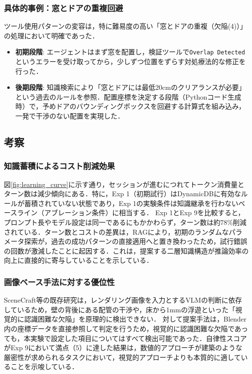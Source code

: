 \documentclass[dvipdfmx, a4paper, 9pt]{deimj}
\begin{document}
\subsubsection{具体的事例：窓とドアの重複回避}

ツール使用パターンの変容は，特に難易度の高い「窓とドアの重複（欠陥(4)）」の処理において明確であった．

\begin{itemize}
  \item \textbf{初期段階}: エージェントはまず窓を配置し，検証ツールで\texttt{Overlap Detected}というエラーを受け取ってから，少しずつ位置をずらす対処療法的な修正を行った．
  \item \textbf{後期段階}: 知識検索により「窓とドアには最低20cmのクリアランスが必要」という過去のルールを参照．配置座標を決定する段階（Pythonコード生成時）で，予めドアのバウンディングボックスを回避する計算式を組み込み，一発で干渉のない配置を実現した．
\end{itemize}

\subsection{考察}

\subsubsection{知識蓄積によるコスト削減効果}
図\ref{fig:learning_curve}に示す通り，セッションが進むにつれてトークン消費量とターン数は減少傾向にある．特に，Exp 1（初期試行）はDynamicDBに有効なルールが蓄積されていない状態であり，Exp 1の実験条件は知識継承を行わないベースライン（アブレーション条件）に相当する．
Exp 1とExp 9を比較すると，プロンプト長やモデル設定は同一であるにもかかわらず，ターン数は約78\%削減されている．ターン数とコストの差異は，RAGにより，初期のランダムなパラメータ探索が，過去の成功パターンの直接適用へと置き換わったため，試行錯誤の回数が激減したことに起因する．これは，提案する二層知識構造が推論効率の向上に直接的に寄与していることを示している．

\subsubsection{画像ベース手法に対する優位性}
SceneCraft等の既存研究は，レンダリング画像を入力とするVLMの判断に依存しているため，壁の背後にある配管の干渉や，床から1mmの浮遊といった「視覚的に認識困難な欠陥」を原理的に検出できない．
対して提案手法は，Blender内の座標データを直接参照して判定を行うため，視覚的に認識困難な欠陥であっても，本実験で設定した項目についてはすべて検出可能であった．自律性スコアがExp 9において満点（5）に達した結果は，数値的アプローチが建築のような厳密性が求められるタスクにおいて，視覚的アプローチよりも本質的に適していることを示唆している．
\end{document}
